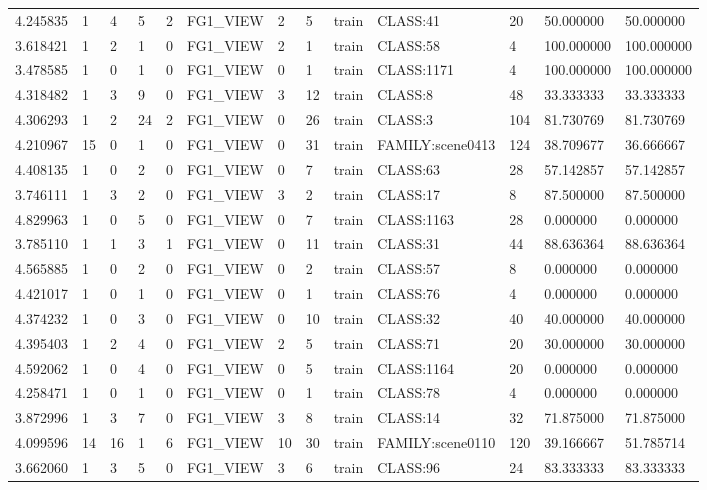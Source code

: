 \begin{tabular}{lllllllllllll}
4.245835 & 1 & 4 & 5 & 2 & FG1\_VIEW & 2 & 5 & train & CLASS:41 & 20 & 50.000000 & 50.000000 \\
3.618421 & 1 & 2 & 1 & 0 & FG1\_VIEW & 2 & 1 & train & CLASS:58 & 4 & 100.000000 & 100.000000 \\
3.478585 & 1 & 0 & 1 & 0 & FG1\_VIEW & 0 & 1 & train & CLASS:1171 & 4 & 100.000000 & 100.000000 \\
4.318482 & 1 & 3 & 9 & 0 & FG1\_VIEW & 3 & 12 & train & CLASS:8 & 48 & 33.333333 & 33.333333 \\
4.306293 & 1 & 2 & 24 & 2 & FG1\_VIEW & 0 & 26 & train & CLASS:3 & 104 & 81.730769 & 81.730769 \\
4.210967 & 15 & 0 & 1 & 0 & FG1\_VIEW & 0 & 31 & train & FAMILY:scene0413 & 124 & 38.709677 & 36.666667 \\
4.408135 & 1 & 0 & 2 & 0 & FG1\_VIEW & 0 & 7 & train & CLASS:63 & 28 & 57.142857 & 57.142857 \\
3.746111 & 1 & 3 & 2 & 0 & FG1\_VIEW & 3 & 2 & train & CLASS:17 & 8 & 87.500000 & 87.500000 \\
4.829963 & 1 & 0 & 5 & 0 & FG1\_VIEW & 0 & 7 & train & CLASS:1163 & 28 & 0.000000 & 0.000000 \\
3.785110 & 1 & 1 & 3 & 1 & FG1\_VIEW & 0 & 11 & train & CLASS:31 & 44 & 88.636364 & 88.636364 \\
4.565885 & 1 & 0 & 2 & 0 & FG1\_VIEW & 0 & 2 & train & CLASS:57 & 8 & 0.000000 & 0.000000 \\
4.421017 & 1 & 0 & 1 & 0 & FG1\_VIEW & 0 & 1 & train & CLASS:76 & 4 & 0.000000 & 0.000000 \\
4.374232 & 1 & 0 & 3 & 0 & FG1\_VIEW & 0 & 10 & train & CLASS:32 & 40 & 40.000000 & 40.000000 \\
4.395403 & 1 & 2 & 4 & 0 & FG1\_VIEW & 2 & 5 & train & CLASS:71 & 20 & 30.000000 & 30.000000 \\
4.592062 & 1 & 0 & 4 & 0 & FG1\_VIEW & 0 & 5 & train & CLASS:1164 & 20 & 0.000000 & 0.000000 \\
4.258471 & 1 & 0 & 1 & 0 & FG1\_VIEW & 0 & 1 & train & CLASS:78 & 4 & 0.000000 & 0.000000 \\
3.872996 & 1 & 3 & 7 & 0 & FG1\_VIEW & 3 & 8 & train & CLASS:14 & 32 & 71.875000 & 71.875000 \\
4.099596 & 14 & 16 & 1 & 6 & FG1\_VIEW & 10 & 30 & train & FAMILY:scene0110 & 120 & 39.166667 & 51.785714 \\
3.662060 & 1 & 3 & 5 & 0 & FG1\_VIEW & 3 & 6 & train & CLASS:96 & 24 & 83.333333 & 83.333333 \\

\end{tabular}
